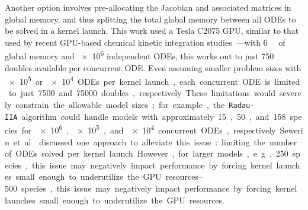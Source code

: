 \documentclass[preprint]{elsarticle}
\begin{document}
Another option involves pre-allocating the Jacobian and associated matrices in global memory, and thus splitting the total global memory between all ODEs to be solved in a kernel launch.
This work used a Tesla C2075 GPU, similar to that used by recent GPU-based chemical kinetic integration studies~\cite{Shi:2011aa,Niemeyer:2011aa,Shi:2012aa,Le2013596,Stone:2013aa,Niemeyer:2014aa}---with \SI{6}{\giga\byte} of global memory and \num{e6} independent ODEs, this works out to just 750 doubles available per concurrent ODE.
Even assuming smaller problem sizes with \SI{e5} or \SI{e4} ODEs per kernel launch, each concurrent ODE is limited to just \num{7500} and \num{75000} doubles, respectively.
These limitations would severely constrain the allowable model sizes; for example, the \texttt{Radau-IIA} algorithm could handle models with approximately 15, 50, and 158 species for \num{e6}, \num{e5}, and \num{e4} concurrent ODEs, respectively.
Sewerin et al.~\cite{Sewerin20151375} discussed one approach to alleviate this issue: limiting the number of ODEs solved per kernel launch. 
However, for larger models, e.g., \SIrange{250}{500} species, this issue may negatively impact performance by forcing kernel launches small enough to underutilize the GPU resources.
\end{document}
